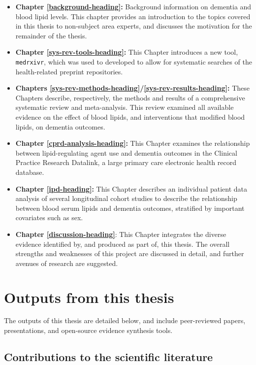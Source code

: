 \documentclass[a4paper, twoside]{templates/ociamthesis}
\providecommand{\tightlist}{%
  \setlength{\itemsep}{0pt}\setlength{\parskip}{0pt}}
\begin{document}
\begin{itemize}
\tightlist
\item
  \textbf{Chapter \ref{background-heading}:} Background information on dementia and blood lipid levels. This chapter provides an introduction to the topics covered in this thesis to non-subject area experts, and discusses the motivation for the remainder of the thesis.
\item
  \textbf{Chapter \ref{sys-rev-tools-heading}:} This Chapter introduces a new tool, \texttt{medrxivr}, which was used to developed to allow for systematic searches of the health-related preprint repositories.
\item
  \textbf{Chapters \ref{sys-rev-methods-heading}/\ref{sys-rev-results-heading}:} These Chapters describe, respectively, the methods and results of a comprehensive systematic review and meta-analysis. This review examined all available evidence on the effect of blood lipids, and interventions that modified blood lipids, on dementia outcomes.
\item
  \textbf{Chapter \ref{cprd-analysis-heading}:} This Chapter examines the relationship between lipid-regulating agent use and dementia outcomes in the Clinical Practice Research Datalink, a large primary care electronic health record database.
\item
  \textbf{Chapter \ref{ipd-heading}:} This Chapter describes an individual patient data analysis of several longitudinal cohort studies to describe the relationship between blood serum lipids and dementia outcomes, stratified by important covariates such as sex.
\item
  \textbf{Chapter \ref{discussion-heading}}: This Chapter integrates the diverse evidence identified by, and produced as part of, this thesis. The overall strengths and weaknesses of this project are discussed in detail, and further avenues of research are suggested.
\end{itemize}

\hypertarget{thesis-output}{%
\section{Outputs from this thesis}\label{thesis-output}}

The outputs of this thesis are detailed below, and include peer-reviewed papers, presentations, and open-source evidence synthesis tools.

\hypertarget{contributions-to-the-scientific-literature}{%
\subsection{Contributions to the scientific literature}\label{contributions-to-the-scientific-literature}}
\end{document}
